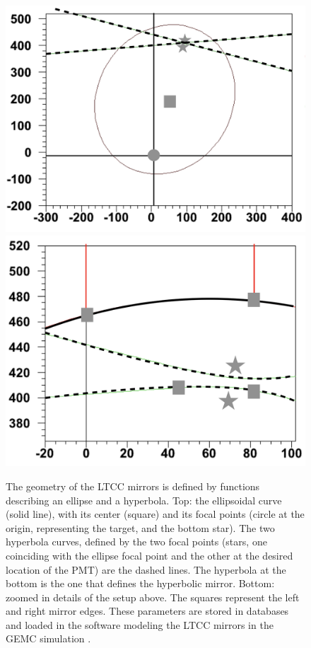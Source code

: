\begin{figure}
	\centering
	\includegraphics[width=0.98\columnwidth,keepaspectratio]{img/mirrorMath1.png}
	\includegraphics[width=0.98\columnwidth,keepaspectratio]{img/mirrorMath2.png}
	\caption{The geometry of the LTCC mirrors is defined by functions describing an ellipse and a hyperbola.
             Top: the ellipsoidal curve (solid line), with its center (square) and its focal points
             (circle at the origin, representing the target, and the bottom star).
             The two hyperbola curves, defined by the two focal points (stars, one coinciding with the ellipse
			 focal point and the other at the desired location of the PMT) are the dashed lines. The
			 hyperbola at the bottom is the one that defines the hyperbolic mirror.
             Bottom: zoomed in details of the setup above. The squares represent the left and right mirror edges.
             These parameters are stored in databases and loaded in the software modeling the LTCC mirrors
             in the GEMC simulation \cite{sim-nim}.}
	\label{fig:mirrorMath}
\end{figure}

